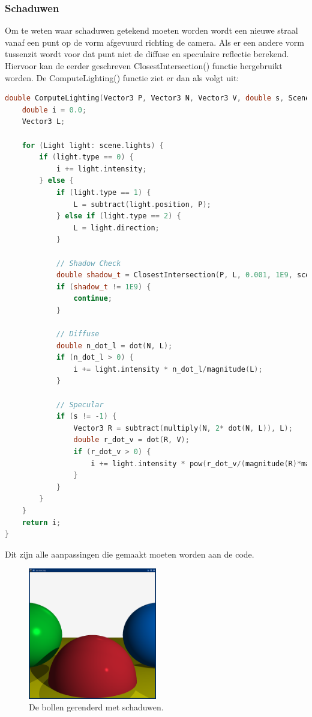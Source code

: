 \documentclass[12pt, a4paper]{article}
\begin{document}
\subsubsection{Schaduwen}
Om te weten waar schaduwen getekend moeten worden wordt een nieuwe straal vanaf een punt op de vorm afgevuurd richting de camera. Als er een andere vorm tussenzit wordt voor dat punt niet de diffuse en speculaire reflectie berekend. Hiervoor kan de eerder geschreven ClosestIntersection() functie hergebruikt worden. De ComputeLighting() functie ziet er dan als volgt uit:

\begin{lstlisting}[language=C++]
double ComputeLighting(Vector3 P, Vector3 N, Vector3 V, double s, Scene scene) {
    double i = 0.0;
    Vector3 L;

    for (Light light: scene.lights) {
        if (light.type == 0) {
            i += light.intensity;
        } else {
            if (light.type == 1) {
                L = subtract(light.position, P);
            } else if (light.type == 2) {
                L = light.direction;
            }

            // Shadow Check
            double shadow_t = ClosestIntersection(P, L, 0.001, 1E9, scene).second;
            if (shadow_t != 1E9) {
                continue;
            } 

            // Diffuse
            double n_dot_l = dot(N, L);
            if (n_dot_l > 0) {
                i += light.intensity * n_dot_l/magnitude(L);
            }

            // Specular
            if (s != -1) {
                Vector3 R = subtract(multiply(N, 2* dot(N, L)), L);
                double r_dot_v = dot(R, V);
                if (r_dot_v > 0) {
                    i += light.intensity * pow(r_dot_v/(magnitude(R)*magnitude(V)), s);
                }
            }
        }
    }
    return i;
}
\end{lstlisting}

Dit zijn alle aanpassingen die gemaakt moeten worden aan de code.

\begin{figure}[H]
    \centering
    \includegraphics[width=0.50\textwidth]{renders/schaduw.png}
    \caption{De bollen gerenderd met schaduwen.}
    \label{fig:schaduw}
\end{figure}
\end{document}
